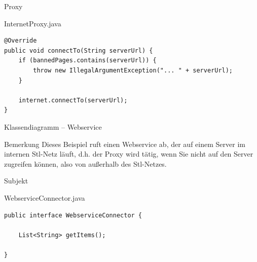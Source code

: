\begin{frame}[fragile]{Proxy}
	\begin{exampleblock}{InternetProxy.java}
        \begin{lstlisting}
@Override
public void connectTo(String serverUrl) {
    if (bannedPages.contains(serverUrl)) {
        throw new IllegalArgumentException("... " + serverUrl);
    }
    
    internet.connectTo(serverUrl);
}
        \end{lstlisting}
 	\end{exampleblock}
\end{frame}

\begin{frame}{Klassendiagramm -- Webservice}
  \pause

  \begin{alertblock}{Bemerkung}
    Dieses Beispiel ruft einen Webservice ab, der auf einem Server im internen Stl-Netz läuft, d.h. der Proxy wird tätig, wenn Sie nicht auf den Server zugreifen können, also von außerhalb des Stl-Netzes.
  \end{alertblock}
\end{frame}

\begin{frame}[fragile]{Subjekt}
	\begin{exampleblock}{WebserviceConnector.java}
        \begin{lstlisting}
public interface WebserviceConnector {

	List<String> getItems();

}
        \end{lstlisting}
 	\end{exampleblock}
\end{frame}

